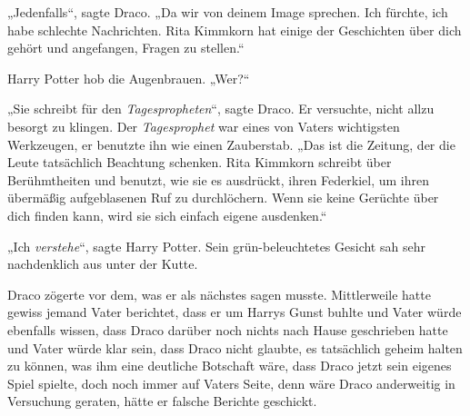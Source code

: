 „Jedenfalls“, sagte Draco. „Da wir von deinem Image sprechen. Ich fürchte, ich habe schlechte Nachrichten. Rita Kimmkorn hat einige der Geschichten über dich gehört und angefangen, Fragen zu stellen.“

Harry Potter hob die Augenbrauen. „Wer?“

„Sie schreibt für den \emph{Tagespropheten}“, sagte Draco. Er versuchte, nicht allzu besorgt zu klingen. Der \emph{Tagesprophet} war eines von Vaters wichtigsten Werkzeugen, er benutzte ihn wie einen Zauberstab. „Das ist die Zeitung, der die Leute tatsächlich Beachtung schenken. Rita Kimmkorn schreibt über Berühmtheiten und benutzt, wie sie es ausdrückt, ihren Federkiel, um ihren übermäßig aufgeblasenen Ruf zu durchlöchern. Wenn sie keine Gerüchte über dich finden kann, wird sie sich einfach eigene ausdenken.“

„Ich \emph{verstehe}“, sagte Harry Potter. Sein grün-beleuchtetes Gesicht sah sehr nachdenklich aus unter der Kutte.

Draco zögerte vor dem, was er als nächstes sagen musste. Mittlerweile hatte gewiss jemand Vater berichtet, dass er um Harrys Gunst buhlte und Vater würde ebenfalls wissen, dass Draco darüber noch nichts nach Hause geschrieben hatte und Vater würde klar sein, dass Draco nicht glaubte, es tatsächlich geheim halten zu können, was ihm eine deutliche Botschaft wäre, dass Draco jetzt sein eigenes Spiel spielte, doch noch immer auf Vaters Seite, denn wäre Draco anderweitig in Versuchung geraten, hätte er falsche Berichte geschickt.

